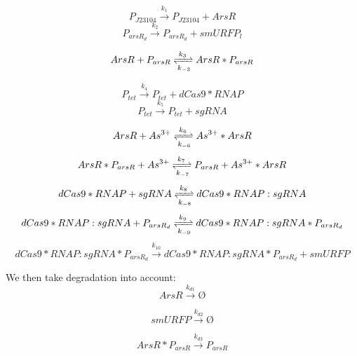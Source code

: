 \documentclass[a4paper,10pt]{article}
\begin{document}
\begin{equation}
P_{J23104} \stackrel{k_1}{\longrightarrow} P_{J23104}+ArsR
\end{equation}
\begin{equation}
P_{arsR_d} \stackrel{k_2}{\longrightarrow} P_{arsR_d} +smURFP_l
\end{equation}

\begin{equation}
ArsR+P_{arsR} \xrightleftharpoons[k_{-3}]{k_3}ArsR*P_{arsR} 
\end{equation} 

\begin{equation}
P_{tet} \stackrel{k_{4}}{\longrightarrow} P_{tet} +dCas9*RNAP
\end{equation}
\begin{equation}
P_{tet} \stackrel{k_{5}}{\longrightarrow} P_{tet} +sgRNA
\end{equation}

\begin{equation}
ArsR +As^{3+}\xrightleftharpoons[k_{-6}]{k_6}As^{3+}*ArsR
\end{equation}
\begin{equation}
ArsR*P_{arsR} +As^{3+}\xrightleftharpoons[k_{-7}]{k_7}P_{arsR}+ As^{3+}*ArsR
\end{equation}
\begin{equation}
dCas9*RNAP+sgRNA\xrightleftharpoons[k_{-8}]{k_8} dCas9*RNAP:sgRNA
\end{equation}
\begin{equation}
dCas9*RNAP:sgRNA+P_{arsR_d}\xrightleftharpoons[k_{-9}]{k_9} dCas9*RNAP:sgRNA*P_{arsR_d}
\end{equation}
\begin{equation}
dCas9*RNAP:sgRNA*P_{arsR_d}\stackrel{k_{10}}{\longrightarrow} dCas9*RNAP:sgRNA*P_{arsR_d}+smURFP
\end{equation}

We then take degradation into account:\\
\begin{equation}
ArsR\stackrel{k_{d1}}{\longrightarrow}Ø
\end{equation}

\begin{equation}
smURFP\stackrel{k_{d2}}{\longrightarrow}Ø
\end{equation}


\begin{equation}
ArsR*P_{arsR}\stackrel{k_{d3}}{\longrightarrow}P_{arsR}
\end{equation}
\end{document}
